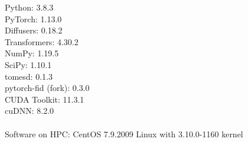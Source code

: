 Python: 3.8.3\\
PyTorch: 1.13.0\\
Diffusers: 0.18.2\\
Transformers: 4.30.2\\
NumPy: 1.19.5\\
SciPy: 1.10.1\\
tomesd: 0.1.3\\
pytorch-fid (fork): 0.3.0\\
CUDA Toolkit: 11.3.1\\
cuDNN: 8.2.0\\
\\
Software on HPC: CentOS 7.9.2009 Linux with 3.10.0-1160 kernel\\